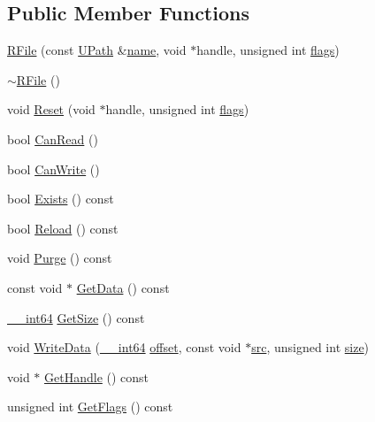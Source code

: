\subsection*{Public Member Functions}
\begin{CompactItemize}
\item 
\hyperlink{class_r_file_ffc05913a9571ccf38ccf645a75164c4}{RFile} (const \hyperlink{class_u_path}{UPath} \&\hyperlink{glext__bak_8h_bb62efe59ccdd153ce42e1a418352209}{name}, void $\ast$handle, unsigned int \hyperlink{_u_t_message_8h_0a3c0b351ab09281b662a9ff4f900a53}{flags})
\item 
\hyperlink{class_r_file_e99ed1a7be564abbe8be041bfe76397d}{$\sim$RFile} ()
\item 
void \hyperlink{class_r_file_4063ce34c2c766729da4e29ca2de79e3}{Reset} (void $\ast$handle, unsigned int \hyperlink{_u_t_message_8h_0a3c0b351ab09281b662a9ff4f900a53}{flags})
\item 
bool \hyperlink{class_r_file_0e6298d7ae56e674c44c5f25b5b23b0a}{CanRead} ()
\item 
bool \hyperlink{class_r_file_66152df59b7c0b3a6a385b00f5d27397}{CanWrite} ()
\item 
bool \hyperlink{class_r_file_72ab94152a88ad19b3c4db258bf49cb0}{Exists} () const 
\item 
bool \hyperlink{class_r_file_e2b38cee29eed7f4469aabc6a5eb3a6e}{Reload} () const 
\item 
void \hyperlink{class_r_file_e8e9458fd38f8c5a183b897e167fce3a}{Purge} () const 
\item 
const void $\ast$ \hyperlink{class_r_file_4958bbe180b2c4544968b4ee6975acbe}{GetData} () const 
\item 
\hyperlink{common__afx_8h_2e015c96ada30f1fdb9322f7af889c10}{\_\-\_\-int64} \hyperlink{class_r_file_8159fd984526bc46e8942a8e1ca3c10c}{GetSize} () const 
\item 
void \hyperlink{class_r_file_0ae8b25ea2cdbe65804418cb03f4b156}{WriteData} (\hyperlink{common__afx_8h_2e015c96ada30f1fdb9322f7af889c10}{\_\-\_\-int64} \hyperlink{glext__bak_8h_a782f3aea23e3c30029c811241dc2c82}{offset}, const void $\ast$\hyperlink{glext__bak_8h_72e0fdf0f845ded60b1fada9e9195cd7}{src}, unsigned int \hyperlink{glext__bak_8h_3d1e3edfcf61ca2d831883e1afbad89e}{size})
\item 
void $\ast$ \hyperlink{class_r_file_27601647d44f5232a50d32f81570a093}{GetHandle} () const 
\item 
unsigned int \hyperlink{class_r_file_a7a3a5a24e39a081e7198024b71e96a2}{GetFlags} () const 
\end{CompactItemize}


